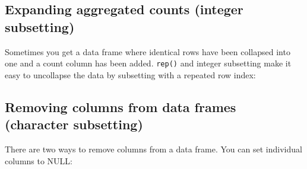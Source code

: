 \subsection{Expanding aggregated counts (integer subsetting)}

Sometimes you get a data frame where identical rows have been collapsed
into one and a count column has been added. \texttt{rep()} and integer
subsetting make it easy to uncollapse the data by subsetting with a
repeated row index:

\begin{Shaded}
\begin{Highlighting}[]
\StringTok{ }\NormalTok{(} \NormalTok{(}\NormalTok{, }\NormalTok{, }\NormalTok{), } \NormalTok{(}\NormalTok{, }\NormalTok{, }\NormalTok{), } \NormalTok{(}\NormalTok{, }\NormalTok{, }\NormalTok{))}
\NormalTok{(}\NormalTok{:}
\NormalTok{df[}\NormalTok{(}\NormalTok{:}\NormalTok{(df), df$n), ]}
\end{Highlighting}
\end{Shaded}

\subsection{Removing columns from data frames (character subsetting)}

There are two ways to remove columns from a data frame. You can set
individual columns to NULL: 

\begin{Shaded}
\begin{Highlighting}[]
\StringTok{ }\NormalTok{(} \NormalTok{:}\NormalTok{, } \NormalTok{:}\NormalTok{, } \NormalTok{letters[}\NormalTok{:}\NormalTok{])}
\StringTok{ }
\end{Highlighting}
\end{Shaded}

